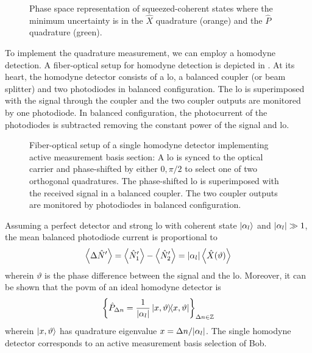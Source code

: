 \begin{figure}[htb]
	\centering
	
	\caption{Phase space representation of squeezed-coherent states where the minimum uncertainty is in the $\hat{X}$ quadrature (orange) and the $\hat{P}$ quadrature (green).}\label{fig:phase_space_squeezed}
\end{figure}
To implement the quadrature measurement, we can employ a homodyne detection.
A fiber-optical setup for homodyne detection is depicted in .
At its heart, the homodyne detector consists of a \gls{lo}, a balanced coupler (or beam splitter) and two photodiodes in balanced configuration.
The \gls{lo} is superimposed with the signal through the coupler and the two coupler outputs are monitored by one photodiode.
In balanced configuration, the photocurrent of the photodiodes is subtracted removing the constant power of the signal and \gls{lo}.
\begin{figure}[htb]
	\centering
	
	\caption{Fiber-optical setup of a single homodyne detector implementing active measurement basis section: A \gls{lo} is synced to the optical carrier and phase-shifted by either $0,\pi/2$ to select one of two orthogonal quadratures. The phase-shifted \gls{lo} is superimposed with the received signal in a balanced coupler. The two coupler outputs are monitored by photodiodes in balanced configuration.}\label{fig:coherent_receiver_active}
\end{figure}
Assuming a perfect detector and strong \gls{lo} with coherent state $\ket{\alpha_l}$ and $\abs{\alpha_l}\gg1$, the mean balanced photodiode current is proportional to~\cite[p.~217]{Vogel2006}
\begin{equation}
	\expval{\Delta\hat{N}^\prime}
	=
	\expval{\hat{N}_1^\prime}
	-
	\expval{\hat{N}_2^\prime}
	=
	\abs{\alpha_l}
	\expval{\hat{X}(\vartheta)}
\end{equation}
wherein $\vartheta$ is the phase difference between the signal and the \gls{lo}.
Moreover, it can be shown that the \gls{povm} of an ideal homodyne detector is~\cite[p.~220]{Vogel2006}
\begin{equation}
	\left\{\hat{P}_{\Delta n}=\frac{1}{\abs{\alpha_l}}\ketbra{x,\vartheta}\right\}_{\Delta n\in\mathbb{Z}}
\end{equation}
wherein $\ket{x,\vartheta}$ has quadrature eigenvalue $x=\Delta n/\abs{\alpha_l}$.
The single homodyne detector corresponds to an active measurement basis selection of Bob.
